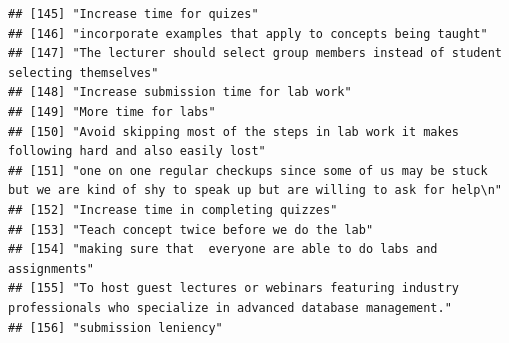 \documentclass[
]{article}
\begin{document}
\begin{verbatim}
## [145] "Increase time for quizes"                                                                                                                                                                                              
## [146] "incorporate examples that apply to concepts being taught"                                                                                                                                                              
## [147] "The lecturer should select group members instead of student selecting themselves"                                                                                                                                      
## [148] "Increase submission time for lab work"                                                                                                                                                                                 
## [149] "More time for labs"                                                                                                                                                                                                    
## [150] "Avoid skipping most of the steps in lab work it makes following hard and also easily lost"                                                                                                                             
## [151] "one on one regular checkups since some of us may be stuck but we are kind of shy to speak up but are willing to ask for help\n"                                                                                        
## [152] "Increase time in completing quizzes"                                                                                                                                                                                   
## [153] "Teach concept twice before we do the lab"                                                                                                                                                                              
## [154] "making sure that  everyone are able to do labs and assignments"                                                                                                                                                        
## [155] "To host guest lectures or webinars featuring industry professionals who specialize in advanced database management."                                                                                                   
## [156] "submission leniency"                                                                                                                                                                                                   

\end{verbatim}
\end{document}
